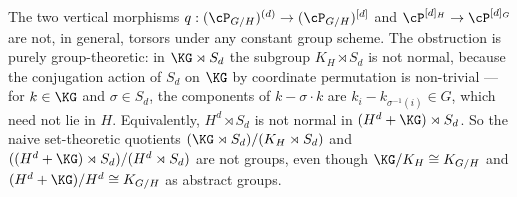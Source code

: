 \begin{rem*}
The two vertical morphisms $q : (\cP_{G/H})^{(d)} \to (\cP_{G/H})^{[d]}$ and $\cP^{[d]_H} \to \cP^{[d]_G}$ are not, in general, torsors under any constant group scheme. The obstruction is purely group-theoretic: in $\KG \rtimes S_d$ the subgroup $K_H \rtimes S_d$ is not normal, because the conjugation action of $S_d$ on $\KG$ by coordinate permutation is non-trivial — for $k \in \KG$ and $\sigma \in S_d$, the components of $k - \sigma\!\cdot\!k$ are $k_i - k_{\sigma^{-1}(i)} \in G$, which need not lie in $H$. Equivalently, $H^d \rtimes S_d$ is not normal in $(H^d + \KG) \rtimes S_d$. So the naive set-theoretic quotients $(\KG \rtimes S_d)/(K_H \rtimes S_d)$ and $((H^d + \KG) \rtimes S_d)/(H^d \rtimes S_d)$ are not groups, even though $\KG/K_H \cong K_{G/H}$ and $(H^d + \KG)/H^d \cong K_{G/H}$ as abstract groups.

\end{rem*}


